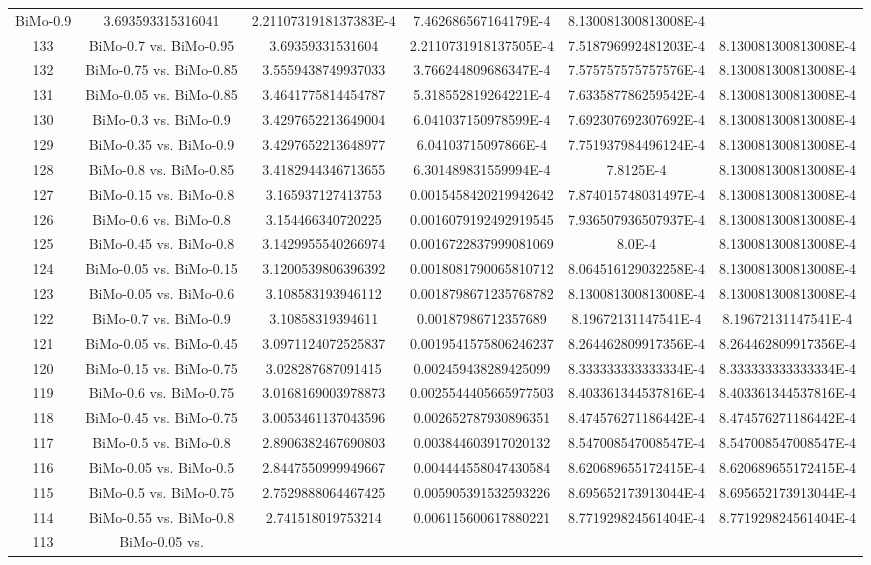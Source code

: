 \documentclass[a4paper,10pt]{article}
\begin{document}
\begin{landscape}
\begin{table}[!htp]
\begin{tabular}{cccccc}
BiMo-0.9&3.693593315316041&2.2110731918137383E-4&7.462686567164179E-4&8.130081300813008E-4\\133&BiMo-0.7 vs. BiMo-0.95&3.69359331531604&2.2110731918137505E-4&7.518796992481203E-4&8.130081300813008E-4\\132&BiMo-0.75 vs. BiMo-0.85&3.5559438749937033&3.766244809686347E-4&7.575757575757576E-4&8.130081300813008E-4\\131&BiMo-0.05 vs. BiMo-0.85&3.4641775814454787&5.318552819264221E-4&7.633587786259542E-4&8.130081300813008E-4\\130&BiMo-0.3 vs. BiMo-0.9&3.4297652213649004&6.041037150978599E-4&7.692307692307692E-4&8.130081300813008E-4\\129&BiMo-0.35 vs. BiMo-0.9&3.4297652213648977&6.04103715097866E-4&7.751937984496124E-4&8.130081300813008E-4\\128&BiMo-0.8 vs. BiMo-0.85&3.4182944346713655&6.301489831559994E-4&7.8125E-4&8.130081300813008E-4\\127&BiMo-0.15 vs. BiMo-0.8&3.165937127413753&0.0015458420219942642&7.874015748031497E-4&8.130081300813008E-4\\126&BiMo-0.6 vs. BiMo-0.8&3.154466340720225&0.0016079192492919545&7.936507936507937E-4&8.130081300813008E-4\\125&BiMo-0.45 vs. BiMo-0.8&3.1429955540266974&0.0016722837999081069&8.0E-4&8.130081300813008E-4\\124&BiMo-0.05 vs. BiMo-0.15&3.1200539806396392&0.0018081790065810712&8.064516129032258E-4&8.130081300813008E-4\\123&BiMo-0.05 vs. BiMo-0.6&3.108583193946112&0.0018798671235768782&8.130081300813008E-4&8.130081300813008E-4\\122&BiMo-0.7 vs. BiMo-0.9&3.10858319394611&0.00187986712357689&8.19672131147541E-4&8.19672131147541E-4\\121&BiMo-0.05 vs. BiMo-0.45&3.0971124072525837&0.0019541575806246237&8.264462809917356E-4&8.264462809917356E-4\\120&BiMo-0.15 vs. BiMo-0.75&3.028287687091415&0.002459438289425099&8.333333333333334E-4&8.333333333333334E-4\\119&BiMo-0.6 vs. BiMo-0.75&3.0168169003978873&0.0025544405665977503&8.403361344537816E-4&8.403361344537816E-4\\118&BiMo-0.45 vs. BiMo-0.75&3.0053461137043596&0.002652787930896351&8.474576271186442E-4&8.474576271186442E-4\\117&BiMo-0.5 vs. BiMo-0.8&2.8906382467690803&0.003844603917020132&8.547008547008547E-4&8.547008547008547E-4\\116&BiMo-0.05 vs. BiMo-0.5&2.8447550999949667&0.004444558047430584&8.620689655172415E-4&8.620689655172415E-4\\115&BiMo-0.5 vs. BiMo-0.75&2.7529888064467425&0.005905391532593226&8.695652173913044E-4&8.695652173913044E-4\\114&BiMo-0.55 vs. BiMo-0.8&2.741518019753214&0.006115600617880221&8.771929824561404E-4&8.771929824561404E-4\\113&BiMo-0.05 vs. 
\end{tabular}
\end{table}
\end{landscape}
\end{document}
